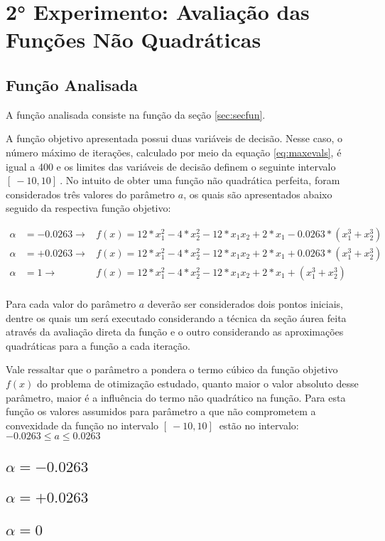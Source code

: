 
\section{2° Experimento: Avaliação das Funções Não Quadráticas}
    \subsection{Função Analisada}

    A função analisada consiste na função da seção \ref{sec:secfun}.

    A função objetivo apresentada possui duas variáveis de decisão. Nesse caso, o número máximo de iterações, calculado por meio da equação \ref{eq:maxevals}, é igual a 400 e os limites das variáveis de decisão definem o seguinte intervalo $[\ -10 , 10 ]\ $. No intuito de obter uma função não quadrática perfeita, foram considerados três valores do parâmetro $a$, os quais são apresentados abaixo seguido da respectiva função objetivo:

    \begin{equation*}   
        \begin{aligned}
            \alpha &=-0.0263 \rightarrow &f(x) = 12*x_1^2 - 4*x_2^2 - 12*x_1x_2 + 2*x_1 -0.0263*(x_1^3+x_2^3)\\
            \alpha &=+0.0263 \rightarrow &f(x) = 12*x_1^2 - 4*x_2^2 - 12*x_1x_2 + 2*x_1 + 0.0263*(x_1^3+x_2^3)\\
            \alpha &=1 \rightarrow &f(x) = 12*x_1^2 - 4*x_2^2 - 12*x_1x_2 + 2*x_1 + (x_1^3+x_2^3)\\   
        \end{aligned}
    \end{equation*}
 
    Para cada valor do parâmetro $a$ deverão ser considerados dois pontos iniciais, dentre os quais um será executado considerando a técnica da seção áurea feita através da avaliação direta da função e o outro considerando as aproximações quadráticas para a função a cada iteração.

    Vale ressaltar que o parâmetro a pondera o termo cúbico da função objetivo $f(x)$ do problema de otimização estudado, quanto maior o valor absoluto desse parâmetro, maior é a influência do termo não quadrático na função. Para esta função os valores assumidos para parâmetro  a que não comprometem a convexidade da função   no intervalo $[\ -10 , 10 ]\ $ estão no intervalo: \\ {\centering $-0.0263 \leq a \leq 0.0263$} \\
    \vspace{2mm}

    \subsection{$\alpha = -0.0263$}
         
    \subsection{$\alpha = +0.0263$}    
          
    \subsection{$\alpha = 0$}
         
\newpage    